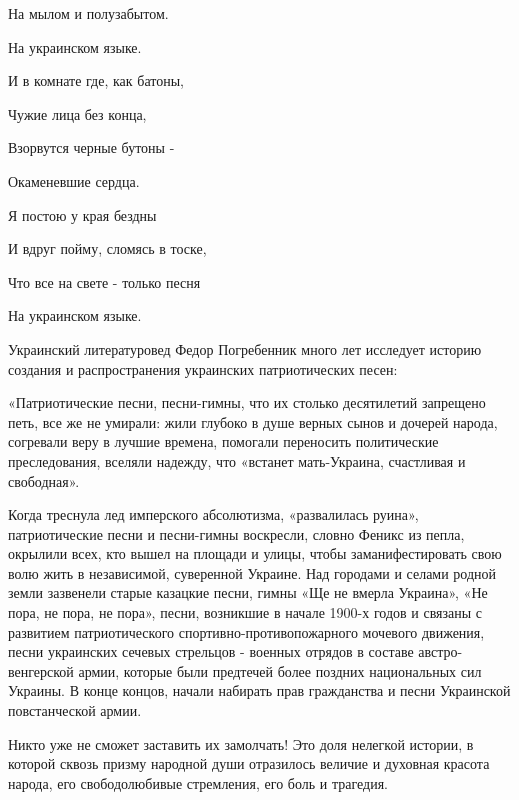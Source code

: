 На мылом и полузабытом.



На украинском языке.



И в комнате где, как батоны,



Чужие лица без конца,



Взорвутся черные бутоны -



Окаменевшие сердца.



Я постою у края бездны



И вдруг пойму, сломясь в тоске,



Что все на свете - только песня



На украинском языке.



Украинский литературовед Федор Погребенник много лет исследует историю создания и распространения украинских патриотических песен:



«Патриотические песни, песни-гимны, что их столько десятилетий запрещено петь, все же не умирали: жили глубоко в душе верных сынов и дочерей народа, согревали веру в лучшие времена, помогали переносить политические преследования, вселяли надежду, что «встанет мать-Украина, счастливая и свободная».



Когда треснула лед имперского абсолютизма, «развалилась руина», патриотические песни и песни-гимны воскресли, словно Феникс из пепла, окрылили всех, кто вышел на площади и улицы, чтобы заманифестировать свою волю жить в независимой, суверенной Украине. Над городами и селами родной земли зазвенели старые казацкие песни, гимны «Ще не вмерла Украина», «Не пора, не пора, не пора», песни, возникшие в начале 1900-х годов и связаны с развитием патриотического спортивно-противопожарного мочевого движения, песни украинских сечевых стрельцов - военных отрядов в составе австро-венгерской армии, которые были предтечей более поздних национальных сил Украины. В конце концов, начали набирать прав гражданства и песни Украинской повстанческой армии.



Никто уже не сможет заставить их замолчать! Это доля нелегкой истории, в которой сквозь призму народной души отразилось величие и духовная красота народа, его свободолюбивые стремления, его боль и трагедия.



